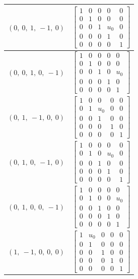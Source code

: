 \documentclass[11pt]{article}
\theoremstyle{definition}
\begin{document}
\begin{longtable}{|l|c|}
    \hline
    $\left( 0, \  0, \  1, \  -1, \  0\right)$ & ${\left[\begin{matrix}1 & 0 & 0 & 0 & 0\\0 & 1 & 0 & 0 & 0\\0 & 0 & 1 & u_{0} & 0\\0 & 0 & 0 & 1 & 0\\0 & 0 & 0 & 0 & 1\end{matrix}\right]}$ \\
    \hline
    $\left( 0, \  0, \  1, \  0, \  -1\right)$ & ${\left[\begin{matrix}1 & 0 & 0 & 0 & 0\\0 & 1 & 0 & 0 & 0\\0 & 0 & 1 & 0 & u_{0}\\0 & 0 & 0 & 1 & 0\\0 & 0 & 0 & 0 & 1\end{matrix}\right]}$ \\
    \hline
    $\left( 0, \  1, \  -1, \  0, \  0\right)$ & ${\left[\begin{matrix}1 & 0 & 0 & 0 & 0\\0 & 1 & u_{0} & 0 & 0\\0 & 0 & 1 & 0 & 0\\0 & 0 & 0 & 1 & 0\\0 & 0 & 0 & 0 & 1\end{matrix}\right]}$ \\
    \hline
    $\left( 0, \  1, \  0, \  -1, \  0\right)$ & ${\left[\begin{matrix}1 & 0 & 0 & 0 & 0\\0 & 1 & 0 & u_{0} & 0\\0 & 0 & 1 & 0 & 0\\0 & 0 & 0 & 1 & 0\\0 & 0 & 0 & 0 & 1\end{matrix}\right]}$ \\
    \hline
    $\left( 0, \  1, \  0, \  0, \  -1\right)$ & ${\left[\begin{matrix}1 & 0 & 0 & 0 & 0\\0 & 1 & 0 & 0 & u_{0}\\0 & 0 & 1 & 0 & 0\\0 & 0 & 0 & 1 & 0\\0 & 0 & 0 & 0 & 1\end{matrix}\right]}$ \\
    \hline
    $\left( 1, \  -1, \  0, \  0, \  0\right)$ & ${\left[\begin{matrix}1 & u_{0} & 0 & 0 & 0\\0 & 1 & 0 & 0 & 0\\0 & 0 & 1 & 0 & 0\\0 & 0 & 0 & 1 & 0\\0 & 0 & 0 & 0 & 1\end{matrix}\right]}$ \\

\end{longtable}
\end{document}
